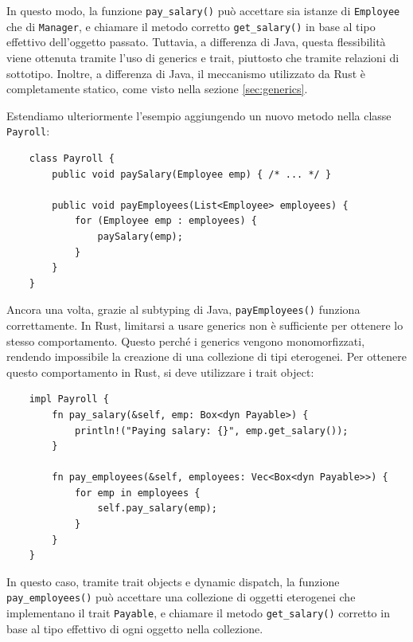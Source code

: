 In questo modo, la funzione \texttt{pay\_salary()} può accettare sia istanze di \texttt{Employee} che di \texttt{Manager}, e chiamare il metodo corretto \texttt{get\_salary()} in base al tipo effettivo dell'oggetto passato. Tuttavia, a differenza di Java, questa flessibilità viene ottenuta tramite l'uso di generics e trait, piuttosto che tramite relazioni di sottotipo. Inoltre, a differenza di Java, il meccanismo utilizzato da Rust è completamente statico, come visto nella sezione \ref{sec:generics}. 

Estendiamo ulteriormente l'esempio aggiungendo un nuovo metodo nella classe \texttt{Payroll}:
\begin{verbatim}
    class Payroll {
        public void paySalary(Employee emp) { /* ... */ }

        public void payEmployees(List<Employee> employees) {
            for (Employee emp : employees) {
                paySalary(emp);
            }
        }
    }
\end{verbatim}
Ancora una volta, grazie al subtyping di Java, \texttt{payEmployees()} funziona correttamente. In Rust, limitarsi a usare generics non è sufficiente per ottenere lo stesso comportamento. Questo perché i generics vengono monomorfizzati, rendendo impossibile la creazione di una collezione di tipi eterogenei. Per ottenere questo comportamento in Rust, si deve utilizzare i trait object:
\begin{verbatim}
    impl Payroll {
        fn pay_salary(&self, emp: Box<dyn Payable>) {
            println!("Paying salary: {}", emp.get_salary());
        }

        fn pay_employees(&self, employees: Vec<Box<dyn Payable>>) {
            for emp in employees {
                self.pay_salary(emp);
            }
        }
    }
\end{verbatim}
In questo caso, tramite trait objects e dynamic dispatch, la funzione \texttt{pay\_employees()} può accettare una collezione di oggetti eterogenei che implementano il trait \texttt{Payable}, e chiamare il metodo \texttt{get\_salary()} corretto in base al tipo effettivo di ogni oggetto nella collezione. 


